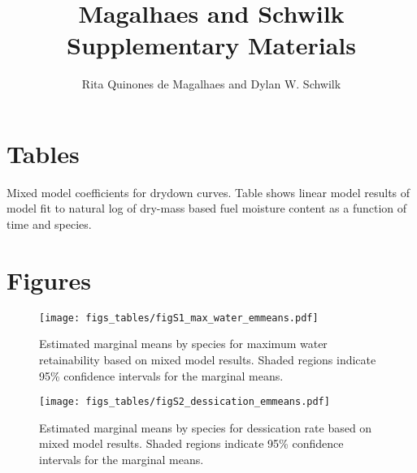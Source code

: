 \documentclass[letterpaper]{article}
\title{Magalhaes and Schwilk Supplementary Materials}
\author{Rita Quinones de Magalhaes and Dylan W. Schwilk}
\begin{document}
\maketitle

\section{Tables}

\begin{table}[h]
  \caption{Mixed model coefficients for drydown curves. Table shows linear model results of model fit to  natural log of dry-mass based fuel moisture content as a function of time and species.} 
  \label{tabS1}
\centering

\end{table}

\section{Figures}

\begin{figure}[h]
  \centering
  \label{fig-S1}

  \texttt{[image: figs\_tables/figS1\_max\_water\_emmeans.pdf]}
\caption{Estimated marginal means by species for maximum water retainability based on mixed model results. Shaded regions indicate 95\% confidence intervals for the marginal means.}

\end{figure}


\begin{figure}[h]
  \centering
  \label{fig-S2}
\texttt{[image: figs\_tables/figS2\_dessication\_emmeans.pdf]}
\caption{Estimated marginal means by species for dessication rate based on mixed model results. Shaded regions indicate 95\% confidence intervals for the marginal means.}
\end{figure}
\end{document}
